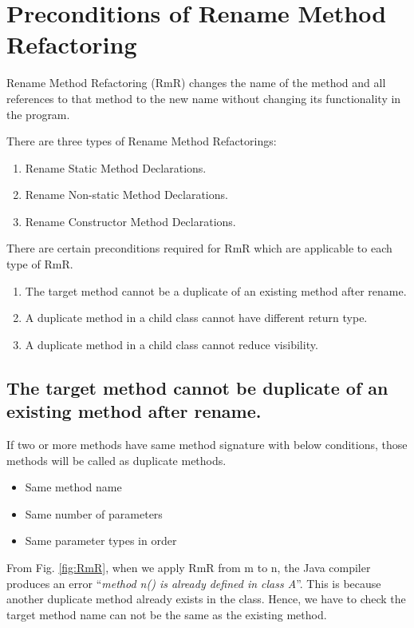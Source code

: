 \section{\textbf{Preconditions of Rename Method Refactoring}}

Rename Method Refactoring (RmR) changes the name of the method and all references to that method to the new name without changing its functionality in the program.

There are three types of Rename Method Refactorings:
\begin{enumerate}
\item Rename Static Method Declarations.
\item Rename Non-static Method Declarations.
\item Rename Constructor Method Declarations.
\end{enumerate}

There are certain preconditions required for RmR which are applicable to each type of RmR.
\begin{enumerate}
	\item The target method cannot be a duplicate of an existing method after rename.
	\item A duplicate method in a child class cannot have different return type.
	\item A duplicate method in a child class cannot reduce visibility.
\end{enumerate}

\subsection {The target method cannot be duplicate of an existing method after rename. }

If two or more methods have same method signature with
below conditions, those methods will be called as duplicate
methods.
\begin{itemize}
	\item Same method name
	\item Same number of parameters
	\item Same parameter types in order
\end{itemize}

From Fig. \ref{fig:RmR}, when we apply RmR from m to n, the Java compiler produces an error ``\textsl{method n() is already defined in class A}''. This is because another duplicate method already exists in the class. Hence, we have to check the target method name can not be the same as the existing method.

